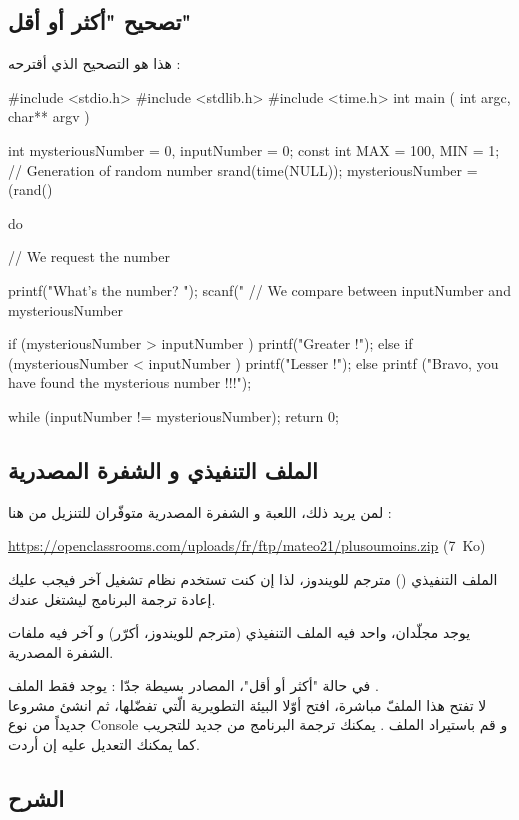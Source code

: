 \subsection{تصحيح "أكثر أو أقل"}

 هذا هو التصحيح الذي أقترحه :
 
\begin{Csource}
#include <stdio.h>
#include <stdlib.h>
#include <time.h>
int main ( int argc, char** argv )
{
	int mysteriousNumber = 0, inputNumber = 0;
	const int MAX = 100, MIN = 1;
	// Generation of random number
	srand(time(NULL));
	mysteriousNumber = (rand() %
	
	do
	{
		// We request the number
		
		printf("What's the number? ");
		scanf("%
		// We compare between inputNumber and mysteriousNumber
		
		if (mysteriousNumber > inputNumber )
		printf("Greater !\n\n");
		else if (mysteriousNumber < inputNumber )
		printf("Lesser !\n\n");
		else
		printf ("Bravo, you have found the mysterious number !!!\n\n");
	} while (inputNumber != mysteriousNumber);
	return 0;
}
\end{Csource}

\subsection{الملف التنفيذي و الشفرة المصدرية}

 لمن يريد ذلك، اللعبة و الشفرة المصدرية متوفّران للتنزيل من هنا :

\textenglish{\url{https://openclassrooms.com/uploads/fr/ftp/mateo21/plusoumoins.zip} \mbox{(7 Ko)}}

\begin{information}
الملف التنفيذي 
()
مترجم للويندوز، لذا إن كنت تستخدم نظام تشغيل آخر فيجب عليك إعادة ترجمة البرنامج ليشتغل عندك.
\end{information}

يوجد مجلّدان، واحد فيه الملف التنفيذي (مترجم للويندوز، أكرّر) و آخر فيه ملفات الشفرة المصدرية.

في حالة "أكثر أو أقل"، المصادر بسيطة جدّا : يوجد فقط الملف
.\\
لا تفتح هذا الملفّ مباشرة، افتح أوّلا البيئة التطويرية الّتي تفضّلها، ثم انشئ مشروعا جديداً من نوع 
\textenglish{Console}
و قم باستيراد الملف 
.
يمكنك ترجمة البرنامج من جديد للتجريب كما يمكنك التعديل عليه إن أردت.

\subsection{الشرح}

